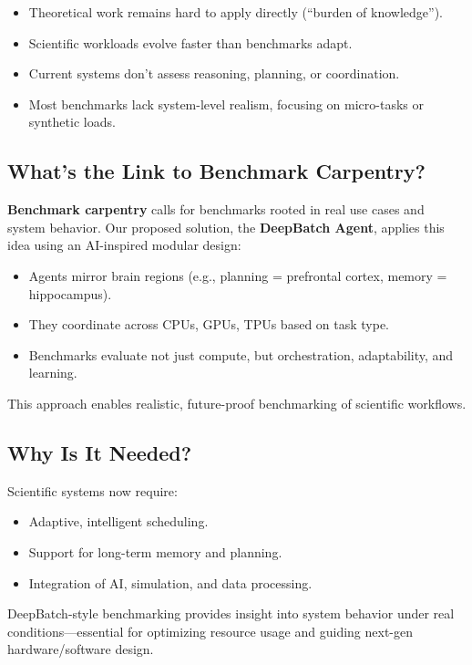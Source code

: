 \begin{itemize}
    \item Theoretical work remains hard to apply directly (“burden of knowledge”).
    \item Scientific workloads evolve faster than benchmarks adapt.
    \item Current systems don’t assess reasoning, planning, or coordination.
    \item Most benchmarks lack system-level realism, focusing on micro-tasks or synthetic loads.
\end{itemize}

\subsection{\textbf{What’s the Link to Benchmark Carpentry?}}

\textbf{Benchmark carpentry} calls for benchmarks rooted in real use cases and system behavior. Our proposed solution, the \textbf{DeepBatch Agent}, applies this idea using an AI-inspired modular design:

\begin{itemize}
    \item Agents mirror brain regions (e.g., planning = prefrontal cortex, memory = hippocampus).
    \item They coordinate across CPUs, GPUs, TPUs based on task type.
    \item Benchmarks evaluate not just compute, but orchestration, adaptability, and learning.
\end{itemize}
This approach enables realistic, future-proof benchmarking of scientific workflows.

\subsection{\textbf{Why Is It Needed?}}

Scientific systems now require:

\begin{itemize}
    \item Adaptive, intelligent scheduling.
    \item Support for long-term memory and planning.
    \item Integration of AI, simulation, and data processing.
\end{itemize}
DeepBatch-style benchmarking provides insight into system behavior under real conditions—essential for optimizing resource usage and guiding next-gen hardware/software design.


